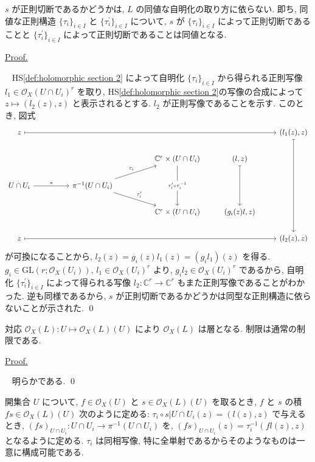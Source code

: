 \documentclass[a4paper,10pt,dvipdfmx]{jsreport}
\newenvironment{defi*}{\refstepcounter{theorem}\begin{itembox}[l]{\underline{Definition \arabic{chapter}.\arabic{section}.\arabic{theorem}.}}\vspace{-0.5zh}\ }{\end{itembox}}
\newenvironment{prop*}{\refstepcounter{theorem}\begin{itembox}[l]{\underline{Proposition \arabic{chapter}.\arabic{section}.\arabic{theorem}. }}\vspace{-0.5zh}\ }{\end{itembox}}
\renewenvironment{proof}{\begin{flushleft} \underline{Proof.} \end{flushleft}\vspace{-1zh}\ }{\qed\\}
\newcounter{theorem}[section]
\theoremstyle{definition}
\begin{document}
\begin{prop*}\label{prop:well-definedness of holomorphical section}
    \(s\) が正則切断であるかどうかは, \(L\) の同値な自明化の取り方に依らない. 即ち, 同値な正則構造 \(\{\tau_i\}_{i\in I}\) と \(\{\tau_i^\prime\}_{i\in I}\) について, \(s\) が \(\{\tau_i\}_{i\in I}\) によって正則切断であることと \(\{\tau_i^\prime\}_{i\in I}\) によって正則切断であることは同値となる. 
\end{prop*}
\begin{proof}
    HS\ref{def:holomorphic section 2} によって自明化 \(\{\tau_i\}_{i\in I}\) から得られる正則写像 \(l_1 \in \mathcal{O}_X(U\cap U_i)^r\) を取り, HS\ref{def:holomorphic section 2}の写像の合成によって \(z \mapsto (l_2(z),z)\) と表示されるとする. \(l_2\) が正則写像であることを示す. このとき, 図式
    \[\begin{tikzcd}
        z &&&&&& {(l_1(z),z)} \\
        &&&& {\mathbb{C}^r\times (U\cap U_i)} & {(l,z)} \\
        {U\cap U_i} && {\pi^{-1}(U\cap U_i)} \\
        &&&& {\mathbb{C}^r\times (U\cap U_i)} & {(g_i(z)l,z)} \\
        z &&&&&& {(l_2(z),z)}
        \arrow["{\tau_i^\prime\circ\tau_i^{-1}}"{description}, from=2-5, to=4-5]
        \arrow["s", from=3-1, to=3-3]
        \arrow["{\tau_i ^\prime}", from=3-3, to=4-5]
        \arrow["{\tau_i}", from=3-3, to=2-5]
        \arrow[maps to, from=5-1, to=5-7]
        \arrow[maps to, from=1-7, to=5-7]
        \arrow[maps to, from=1-1, to=1-7]
        \arrow[maps to, from=2-6, to=4-6]
    \end{tikzcd}\]
    が可換になることから, \(l_2(z) = g_i(z)l_1(z) = (g_i l_1)(z)\) を得る. \(g_i \in \textrm{GL}(r;\mathcal{O}_X(U_i))\), \(l_1\in \mathcal{O}_X(U_i)^r\) より, \(g_i l_2 \in \mathcal{O}_X(U_i)^r\) であるから, 自明化 \(\{\tau^\prime_i\}_{i\in I}\) によって得られる写像 \(l_2 \colon \mathbb{C}^r \to \mathbb{C}^r\) もまた正則写像であることがわかった. 逆も同様であるから, \(s\) が正則切断であるかどうかは同型な正則構造に依らないことが示された.
\end{proof}
\begin{prop*}
    対応 \(\mathcal{O}_X(L)\colon U\mapsto \mathcal{O}_X(L)(U)\) により \(\mathcal{O}_X(L)\) は層となる. 制限は通常の制限である.
\end{prop*}
\begin{proof}
    明らかである.
\end{proof}
\begin{defi*}
    開集合 \(U\) について, \(f\in \mathcal{O}_X(U)\) と \(s\in \mathcal{O}_X(L)(U)\) を取るとき, \(f\) と \(s\) の積 \(fs \in \mathcal{O}_X(L)(U)\) 次のように定める: \(\tau_i \circ s|U\cap U_i(z) = (l(z),z)\) で与えるとき, \((fs)_{U\cap U_i} \colon U\cap U_i \to \pi^{-1}(U\cap U_i)\) を, \((fs)_{U\cap U_i}(z) = \tau_i ^{-1}(fl(z), z)\) となるように定める. \(\tau_i\) は同相写像, 特に全単射であるからそのようなものは一意に構成可能である. 
\end{defi*}
\end{document}
